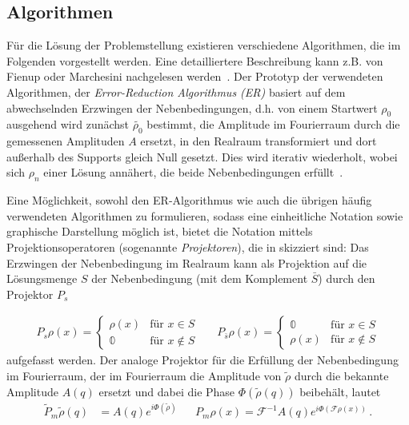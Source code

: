 \subsection{Algorithmen}
Für die Lösung der Problemstellung existieren verschiedene Algorithmen, die im Folgenden vorgestellt werden. Eine detailliertere Beschreibung kann z.B. von Fienup oder Marchesini nachgelesen werden~\cite{marchesini2007,fienup1982}.
Der Prototyp der verwendeten Algorithmen, der \textit{Error-Reduction Algorithmus (ER)} basiert auf dem abwechselnden Erzwingen der Nebenbedingungen, d.h. von einem Startwert $\rho_0$ ausgehend wird zunächst $\tilde{\rho_0}$ bestimmt, die Amplitude im Fourierraum durch die gemessenen Amplituden $A$ ersetzt, in den Realraum transformiert und dort außerhalb des Supports gleich Null gesetzt. Dies wird iterativ wiederholt, wobei sich $\rho_n$ einer Lösung annähert, die beide Nebenbedingungen erfüllt~\cite{fienup1978}.

Eine Möglichkeit, sowohl den ER-Algorithmus wie auch die übrigen häufig verwendeten Algorithmen zu formulieren, sodass eine einheitliche Notation sowie graphische Darstellung möglich ist, bietet die Notation mittels Projektionsoperatoren (sogenannte \textit{Projektoren}), die in  skizziert sind:
Das Erzwingen der Nebenbedingung im Realraum kann als Projektion auf die Lösungsmenge $S$ der Nebenbedingung  (mit dem Komplement $\bar{S}$) durch den Projektor $P_s$ 

\begin{align}
	P_s\rho (x)=\begin{cases}
	\rho (x)  &\text{für } x\in S\\
	\mathbb{0}  &\text{für }x\notin S
	\end{cases} &   &   
	P_{\bar{s}}\rho (x)=\begin{cases}
	\mathbb{0} &\text{für } x\in S\\
	\rho (x)   &\text{für }x\notin S
	\end{cases}
\end{align}
aufgefasst werden. Der analoge Projektor für die Erfüllung der Nebenbedingung im Fourierraum, der im Fourierraum die Amplitude von $\tilde{\rho}$ durch die bekannte Amplitude $A(q)$ ersetzt und dabei die Phase $\Phi\left(\tilde{\rho}\left(q\right)\right)$ beibehält, lautet
\begin{align}
	\tilde{P}_m \tilde{\rho}(q) & =A(q)e^{i\Phi(\tilde{\rho})} &   & P_m\rho(x)=\mathscr{F}^{-1}A(q)e^{i\Phi\left(\mathscr{F}\rho\left(x\right)\right)} \,. 
\end{align}

